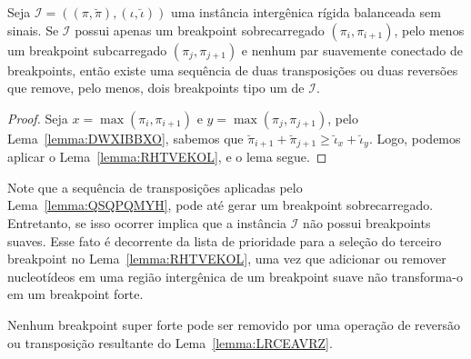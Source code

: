 \begin{lemma}\label{lemma:QSQPQMYH}
Seja $\mathcal{I} = ((\pi,\breve\pi),(\iota,\breve\iota))$ uma instância intergênica rígida balanceada sem sinais. Se $\mathcal{I}$ possui apenas um breakpoint sobrecarregado $(\pi_i,\pi_{i+1})$, pelo menos um breakpoint subcarregado $(\pi_j,\pi_{j+1})$ e nenhum par suavemente conectado de breakpoints, então existe uma sequência de duas transposições ou duas reversões que remove, pelo menos, dois breakpoints tipo um de $\mathcal{I}$.
\end{lemma}
\begin{proof}
Seja $x = \max(\pi_i,\pi_{i+1})$ e $y=\max(\pi_j,\pi_{j+1})$, pelo Lema~\ref{lemma:DWXIBBXO}, sabemos que $\breve\pi_{i+1} + \breve\pi_{j+1} \ge \breve\iota_{x} + \breve\iota_{y}$. Logo, podemos aplicar o Lema~\ref{lemma:RHTVEKOL}, e o lema segue.
\end{proof}

Note que a sequência de transposições aplicadas pelo Lema~\ref{lemma:QSQPQMYH}, pode até gerar um breakpoint sobrecarregado. Entretanto, se isso ocorrer implica que a instância $\mathcal{I}$ não possui breakpoints suaves. Esse fato é decorrente da lista de prioridade para a seleção do terceiro breakpoint no Lema~\ref{lemma:RHTVEKOL}, uma vez que adicionar ou remover nucleotídeos em uma região intergênica de um breakpoint suave não transforma-o em um breakpoint forte.

\begin{remark}\label{remark:QVNWZDDQ}
Nenhum breakpoint super forte pode ser removido por uma operação de reversão ou transposição resultante do Lema~\ref{lemma:LRCEAVRZ}.
\end{remark}

